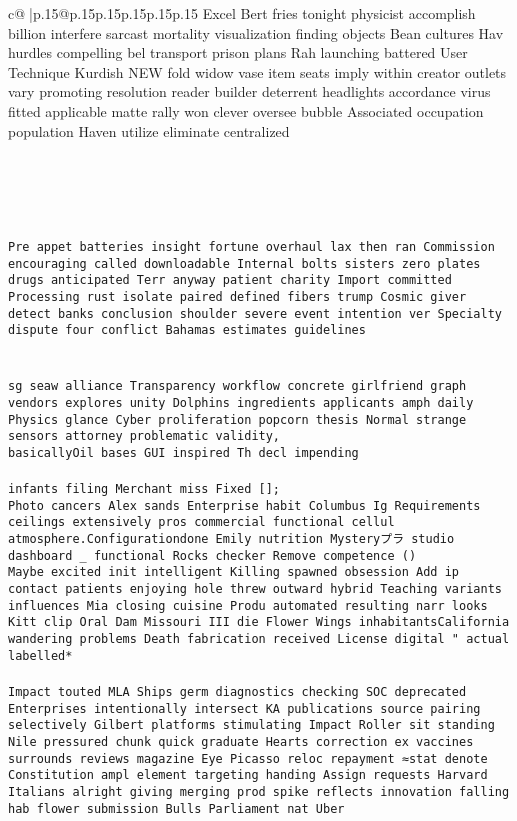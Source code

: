 \documentclass{article}
\begin{document}
{\begin{supertabular}{c@{$\;$}|p{.15\linewidth}@{}p{.15\linewidth}p{.15\linewidth}p{.15\linewidth}p{.15\linewidth}p{.15\linewidth}}
{{{Excel Bert fries tonight physicist accomplish billion interfere sarcast mortality visualization finding objects Bean cultures Hav hurdles compelling bel transport prison plans Rah launching battered User Technique Kurdish NEW fold widow vase item seats imply within creator outlets vary promoting resolution reader builder deterrent headlights accordance virus fitted applicable matte rally won clever oversee bubble Associated occupation population Haven utilize eliminate centralized\\ \tt \\ \tt \\ \tt \\ \tt \\ \tt \\ \tt Pre appet batteries insight fortune overhaul lax then ran Commission encouraging called downloadable Internal bolts sisters zero plates drugs anticipated Terr anyway patient charity Import committed Processing rust isolate paired defined fibers trump Cosmic giver detect banks conclusion shoulder severe event intention ver Specialty dispute four conflict Bahamas estimates guidelines\\ \tt \\ \tt \\ \tt sg seaw alliance Transparency workflow concrete girlfriend graph vendors explores unity Dolphins ingredients applicants amph daily Physics glance Cyber proliferation popcorn thesis Normal strange sensors attorney problematic validity,\\ \tt basicallyOil bases GUI inspired Th decl impending \\ \tt \\ \tt  infants filing Merchant miss Fixed [];\\ \tt  Photo cancers Alex sands Enterprise habit Columbus Ig Requirements ceilings extensively pros commercial functional cellul atmosphere.Configurationdone Emily nutrition Mysteryプラ studio dashboard _ functional Rocks checker Remove competence ()\\ \tt Maybe excited init intelligent Killing spawned obsession Add ip contact patients enjoying hole threw outward hybrid Teaching variants influences Mia closing cuisine Produ automated resulting narr looks Kitt clip Oral Dam Missouri III die Flower Wings inhabitantsCalifornia wandering problems Death fabrication received License digital "\ actual labelled*\\ \tt \\ \tt  Impact touted MLA Ships germ diagnostics checking SOC deprecated Enterprises intentionally intersect KA publications source pairing selectively Gilbert platforms stimulating Impact Roller sit standing Nile pressured chunk quick graduate Hearts correction ex vaccines surrounds reviews magazine Eye Picasso reloc repayment ≈stat denote Constitution ampl element targeting handing Assign requests Harvard Italians alright giving merging prod spike reflects innovation falling hab flower submission Bulls Parliament nat Uber\\ \tt  }}}
\end{supertabular}}
\end{document}
